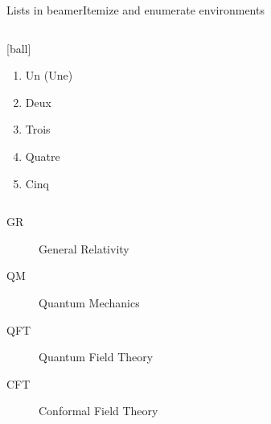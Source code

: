 \documentclass[x11names,aspectratio=32]{beamer}
\begin{document}
\begin{frame}{Lists in beamer}{Itemize and enumerate environments}
\begin{columns}
        \begin{column}{.4\textwidth}

            [ball]
            \begin{enumerate}
                \item Un (Une)
                \item Deux
                \item Trois
                \item Quatre
                \item Cinq
            \end{enumerate}

        \end{column}
    \end{columns}

    \vspace{4em}

    \begin{columns}
        \begin{column}{\linewidth}
            

            \begin{description}
                \item[GR] General Relativity
                \item[QM] Quantum Mechanics
                \item[QFT] Quantum Field Theory
                \item[CFT] Conformal Field Theory
            \end{description}
        \end{column}
    \end{columns}
\end{frame}
\end{document}

